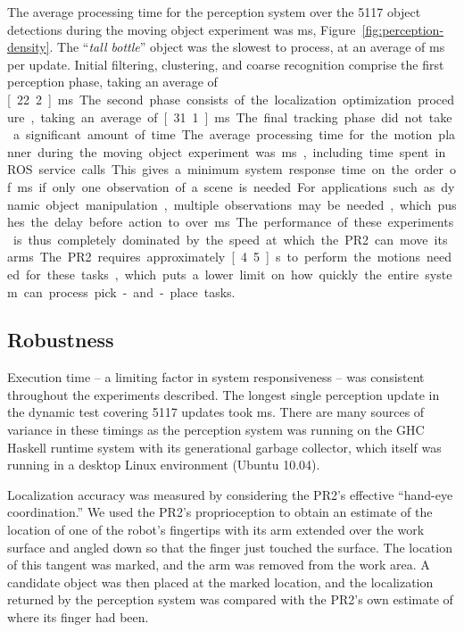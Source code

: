 \documentclass[letterpaper, 10 pt, conference]{ieeeconf}  %
\begin{document}
The average processing time for the perception system over the 5117
object detections during the moving object experiment was
\unit[53]{ms}, Figure~\ref{fig:perception-density}. The ``\textit{tall
  bottle}'' object was the slowest to process, at an average of
\unit[77]{ms} per update. Initial filtering, clustering, and coarse
recognition comprise the first perception phase, taking an average of
\unit[22.2]{ms}. The second phase consists of the localization
optimization procedure, taking an average of \unit[31.1]{ms}. The
final tracking phase did not take a significant amount of time.

The average processing time for the motion planner during the moving
object experiment was \unit[182]{ms}, including time spent in ROS
service calls. This gives a minimum system response time on the order
of \unit[250]{ms} if only one observation of a scene is needed. For
applications such as dynamic object manipulation, multiple
observations may be needed, which pushes the delay before action to
over \unit[400]{ms}. The performance of these experiments is thus
completely dominated by the speed at which the PR2 can move its
arms. The PR2 requires approximately \unit[4.5]{s} to perform the
motions needed for these tasks, which puts a lower limit on how
quickly the entire system can process pick-and-place tasks.

\subsection{Robustness}
Execution time -- a limiting factor in system responsiveness -- was
consistent throughout the experiments described. The longest single
perception update in the dynamic test covering 5117 updates took
\unit[132]{ms}. There are many sources of variance in these timings as
the perception system was running on the GHC Haskell runtime system
with its generational garbage collector, which itself was running in a
desktop Linux environment (Ubuntu 10.04).

Localization accuracy was measured by considering the PR2's effective
``hand-eye coordination.'' We used the PR2's proprioception to obtain
an estimate of the location of one of the robot's fingertips with its
arm extended over the work surface and angled down so that the finger
just touched the surface. The location of this tangent was marked, and
the arm was removed from the work area. A candidate object was then
placed at the marked location, and the localization returned by the
perception system was compared with the PR2's own estimate of where
its finger had been. 
\end{document}
